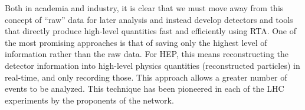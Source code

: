 
Both in academia and industry, it is clear that we must move away from this concept of ``raw'' data for later analysis and instead develop detectors and tools that directly produce high-level quantities fast and efficiently using RTA.
One of the most promising approaches is that of saving only the highest level of information rather than the raw data. 
For HEP, this means reconstructing the detector information into high-level physics quantities (reconstructed particles) in real-time, and only recording those.
This approach allows a greater number of events to be analyzed.
This technique has been pioneered in each of the LHC experiments by the proponents of the \acronym network. 

